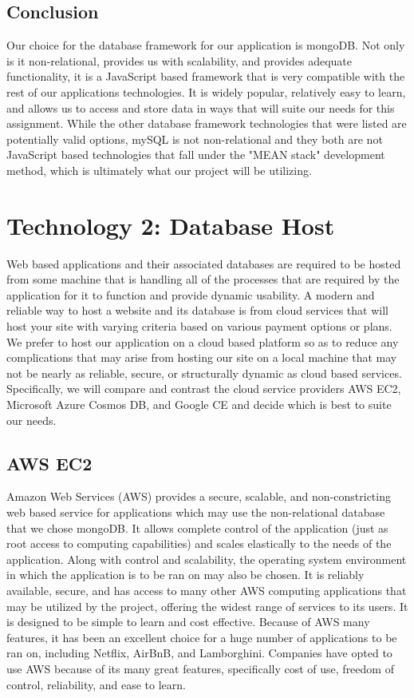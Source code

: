 \documentclass[onecolumn, draftclsnofoot,10pt, compsoc]{IEEEtran}
\begin{document}
	\subsection{Conclusion}
	
		Our choice for the database framework for our application is mongoDB. Not only is it non-relational, provides us with scalability, and provides adequate functionality, it is
		a JavaScript based framework that is very compatible with the rest of our applications technologies. It is widely popular, relatively easy to learn, and allows us
		to access and store data in ways that will suite our needs for this assignment. While the other database framework technologies that were listed are potentially valid options,
		mySQL is not non-relational and they both are not JavaScript based technologies that fall under the "MEAN stack" development method, which is ultimately what our project will be utilizing. 
		

\section{Technology 2: Database Host}

	Web based applications and their associated databases are required to be hosted from some machine that is handling all of the processes that are required by the application for it 
	to function and provide dynamic usability. A modern and reliable way to host a website and its database is from cloud services that will host your site with varying criteria
	based on various payment options or plans. We prefer to host our application on a cloud based platform so as to reduce any complications that may arise 
	from hosting our site on a local machine that may not be nearly as reliable, secure, or structurally dynamic as cloud based services. Specifically, we will
	compare and contrast the cloud service providers AWS EC2, Microsoft Azure Cosmos DB, and Google CE and decide which is best to suite our needs.
	
	\subsection{AWS EC2}
	
		Amazon Web Services (AWS) provides a secure, scalable, and non-constricting web based service for applications which may use the non-relational database that we chose mongoDB. It allows complete control of the application (just as root access 
		to computing capabilities) and scales elastically to the needs of the application. Along with control and scalability, the operating system environment in which the application
		is to be ran on may also be chosen. It is reliably available, secure, and has access to many other AWS computing applications that may be utilized by the project, offering the widest
		range of services to its users. It is designed to be simple to learn and cost effective. Because of AWS many features, it has been an excellent choice for a huge number of applications to be ran on, including
		Netflix, AirBnB, and Lamborghini. Companies have opted to use AWS because of its many great features, specifically cost of use, freedom of control, reliability, and ease to learn. 
	
\end{document}
